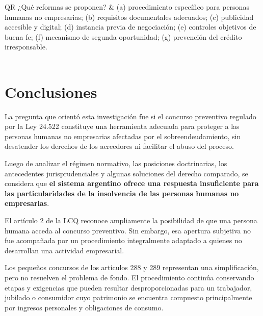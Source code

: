 \documentclass[12pt,oneside]{book}
\begin{document}
\begin{longtable}{QR}
¿Qué reformas se proponen? &
(a) procedimiento específico para personas humanas no empresarias; (b) requisitos documentales adecuados; (c) publicidad accesible y digital; (d) instancia previa de negociación; (e) controles objetivos de buena fe; (f) mecanismo de segunda oportunidad; (g) prevención del crédito irresponsable. \\
\midrule
{} \\
\bottomrule
\end{longtable}

\chapter[Conclusiones]{Conclusiones}

La pregunta que orientó esta investigación fue si el concurso preventivo regulado por la Ley 24.522 constituye una herramienta adecuada para proteger a las personas humanas no empresarias afectadas por el sobreendeudamiento, sin desatender los derechos de los acreedores ni facilitar el abuso del proceso.

Luego de analizar el régimen normativo, las posiciones doctrinarias, los antecedentes jurisprudenciales y algunas soluciones del derecho comparado, se considera que \textbf{el sistema argentino ofrece una respuesta insuficiente para las particularidades de la insolvencia de las personas humanas no empresarias}.

El artículo 2 de la LCQ reconoce ampliamente la posibilidad de que una persona humana acceda al concurso preventivo. Sin embargo, esa apertura subjetiva no fue acompañada por un procedimiento integralmente adaptado a quienes no desarrollan una actividad empresarial.

Los pequeños concursos de los artículos 288 y 289 representan una simplificación, pero no resuelven el problema de fondo. El procedimiento continúa conservando etapas y exigencias que pueden resultar desproporcionadas para un trabajador, jubilado o consumidor cuyo patrimonio se encuentra compuesto principalmente por ingresos personales y obligaciones de consumo.
\end{document}
